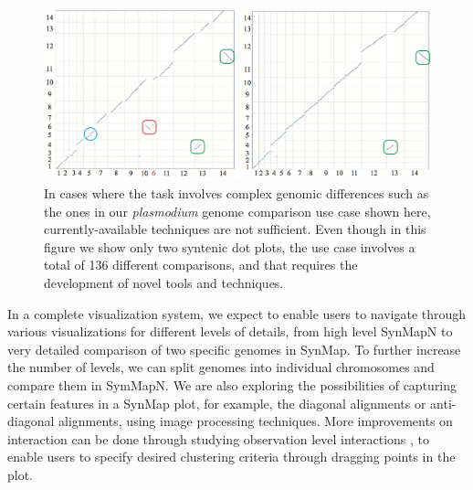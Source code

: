 \documentclass{vgtc}                      %
\begin{document}
\begin{figure}[t]
 \centering
 \includegraphics[width=\columnwidth]{plasmodium}
 \caption{In cases where the task involves complex genomic differences such as the ones in our \emph{plasmodium} genome comparison use case shown here, currently-available techniques are not sufficient. Even though in this figure we show only two syntenic dot plots, the use case involves a total of 136 different comparisons, and that requires the development of novel tools and techniques.}
 \label{fig:plasmodium}
\end{figure}




  
In a complete visualization system, we expect to enable users to navigate through various visualizations for different levels of details, from high level SynMapN to very detailed comparison of two specific genomes in SynMap. To further increase the number of levels, we can split genomes into individual chromosomes and compare them in SymMapN. We are also exploring the possibilities of capturing certain features in a SynMap plot, for example, the diagonal alignments or anti-diagonal alignments, using image processing techniques. More improvements on interaction can be done through studying observation level interactions \cite{endert2011observation}, to enable users to specify desired clustering criteria through dragging points in the plot. 





%

%
%
%


\end{document}
